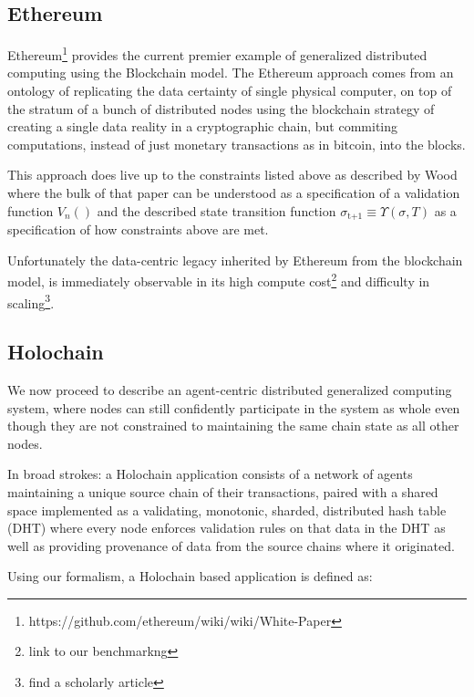 \documentclass[twocolumn,showpacs,
  nofootinbib,aps,superscriptaddress,
  eqsecnum,prd,notitlepage,showkeys,10pt]{revtex4-1}
\begin{document}
\subsection{Ethereum}
Ethereum\footnote{https://github.com/ethereum/wiki/wiki/White-Paper} provides the current premier example of generalized distributed computing using the Blockchain model. The Ethereum approach comes from an ontology of replicating the data certainty of single physical computer, on top of the stratum of a bunch of distributed nodes using the blockchain strategy of creating a single data reality in a cryptographic chain, but commiting computations, instead of just monetary transactions as in bitcoin, into the blocks.

This approach does live up to the constraints listed above as described by Wood \cite{yellowpaper} where the bulk of that paper can be understood as a specification of a validation function $V_n()$ and the described state transition function $\sigma_\text{t+1} \equiv \Upsilon(\sigma,T)$ as a specification of how constraints above are met.

Unfortunately the data-centric legacy inherited by Ethereum from the blockchain model, is immediately observable in its high compute cost\footnote{link to our benchmarkng} and difficulty in scaling\footnote{find a scholarly article }.


\subsection{Holochain}
\label{holochain}
We now proceed to describe an agent-centric distributed generalized computing system, where nodes can still confidently participate in the system as whole even though they are not constrained to maintaining the same chain state as all other nodes.

In broad strokes: a Holochain application consists of a network of agents maintaining a unique source chain of their transactions, paired with a shared space implemented as a validating, monotonic, sharded, distributed hash table (DHT) where every node enforces validation rules on that data in the DHT as well as providing provenance of data from the source chains where it originated.

Using our formalism, a Holochain based application \shc is defined as:
\end{document}
